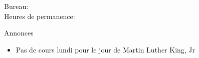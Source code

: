 \documentclass{beamer}
\subtitle[Rôles masculins et féminins]{Les rôles masculins et féminins}
\begin{document}
  \begin{frame}
    \titlepage
    \tiny{Bureau: \\
          Heures de permanence: }
  \end{frame}

  \begin{frame}{Annonces}
    \begin{itemize}
      \item Pas de cours lundi pour le jour de Martin Luther King, Jr
    \end{itemize}
  \end{frame}

\end{document}
